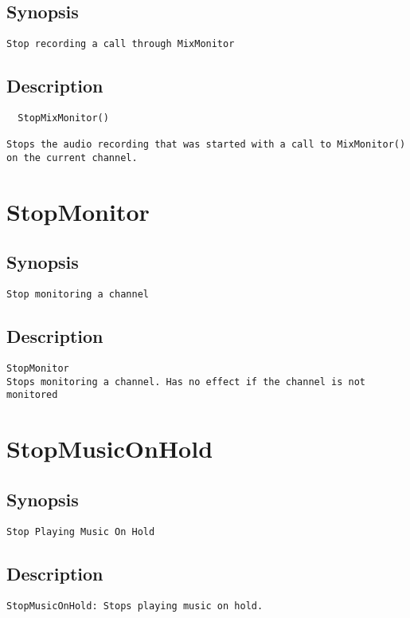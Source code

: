 \subsection{Synopsis}
\begin{verbatim}
Stop recording a call through MixMonitor
\end{verbatim}
\subsection{Description}
\begin{verbatim}
  StopMixMonitor()

Stops the audio recording that was started with a call to MixMonitor()
on the current channel.

\end{verbatim}


\section{StopMonitor}
\subsection{Synopsis}
\begin{verbatim}
Stop monitoring a channel
\end{verbatim}
\subsection{Description}
\begin{verbatim}
StopMonitor
Stops monitoring a channel. Has no effect if the channel is not monitored

\end{verbatim}


\section{StopMusicOnHold}
\subsection{Synopsis}
\begin{verbatim}
Stop Playing Music On Hold
\end{verbatim}
\subsection{Description}
\begin{verbatim}
StopMusicOnHold: Stops playing music on hold.

\end{verbatim}


